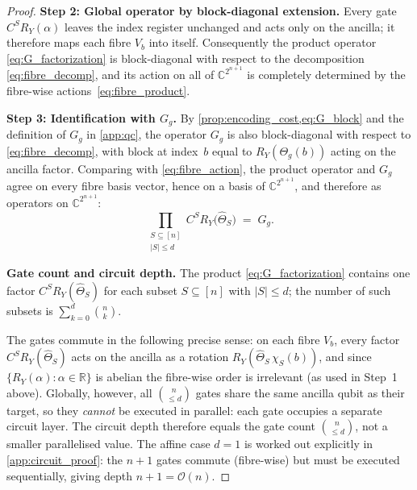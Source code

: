 \documentclass[12pt,a4paper]{article}
\theoremstyle{plain}
\theoremstyle{definition}
\theoremstyle{remark}
\newcommand{\R}{\mathbb{R}}
\newcommand{\Ry}{R_Y}
\newcommand{\Thetag}{\Theta_g}
\newcommand{\wh}[2]{\hat{#1}_{#2}}
\newcommand{\chimon}[1]{\chi_{#1}}
\begin{document}
\begin{proof}
\medskip
\noindent\textbf{Step 2: Global operator by block-diagonal extension.}
Every gate $C^S\Ry(\alpha)$ leaves the index register unchanged and
acts only on the ancilla; it therefore maps each fibre $V_b$ into
itself.
Consequently the product operator \eqref{eq:G_factorization} is
block-diagonal with respect to the decomposition
\eqref{eq:fibre_decomp}, and its action on all of
$\mathbb{C}^{2^{n+1}}$ is completely determined by the fibre-wise
actions~\eqref{eq:fibre_product}.

\medskip
\noindent\textbf{Step 3: Identification with $G_g$.}
By \cref{prop:encoding_cost,eq:G_block} and the definition of $G_g$
in \cref{app:qc}, the operator $G_g$ is also block-diagonal with
respect to \eqref{eq:fibre_decomp}, with block at index~$b$ equal to
$R_Y(\Thetag(b))$ acting on the ancilla factor.
Comparing with \eqref{eq:fibre_action}, the product operator and $G_g$
agree on every fibre basis vector, hence on a basis of
$\mathbb{C}^{2^{n+1}}$, and therefore as operators on
$\mathbb{C}^{2^{n+1}}$:
\[
  \prod_{\substack{S\subseteq[n]\\ |S|\leq d}}
  C^S\Ry\!\bigl(\wh{\Theta}{S}\bigr)
  \;=\; G_g.
\]

\medskip
\noindent\textbf{Gate count and circuit depth.}
The product \eqref{eq:G_factorization} contains one factor
$C^S\Ry(\wh{\Theta}{S})$ for each subset $S\subseteq[n]$ with
$|S|\leq d$; the number of such subsets is $\sum_{k=0}^{d}\binom{n}{k}$.

The gates commute in the following precise sense: on each fibre $V_b$,
every factor $C^S\Ry(\wh{\Theta}{S})$ acts on the ancilla as a
rotation $R_Y(\wh{\Theta}{S}\,\chimon{S}(b))$, and since
$\{R_Y(\alpha):\alpha\in\R\}$ is abelian the fibre-wise order is
irrelevant (as used in Step~1 above).
Globally, however, all $\binom{n}{\leq d}$ gates share the same
ancilla qubit as their target, so they \emph{cannot} be executed in
parallel: each gate occupies a separate circuit layer.
The circuit depth therefore equals the gate count
$\binom{n}{\leq d}$, not a smaller parallelised value.
The affine case $d=1$ is worked out explicitly in
\cref{app:circuit_proof}: the $n+1$ gates commute (fibre-wise) but
must be executed sequentially, giving depth $n+1=\mathcal{O}(n)$.
\end{proof}
\end{document}
